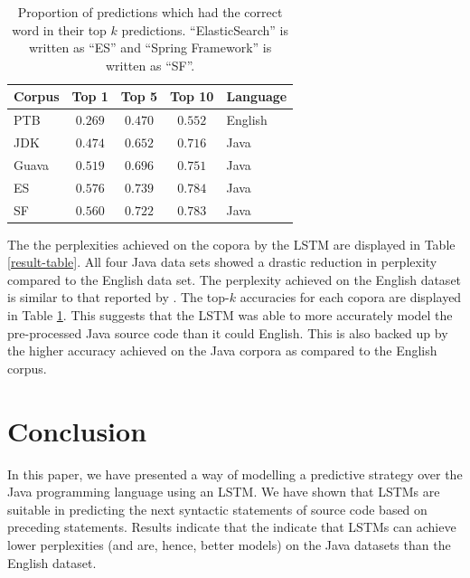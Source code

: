 \documentclass{article}
\begin{document}
\begin{table}[t]
    \caption{Proportion of predictions which had the correct
    word in their top $k$ predictions.
    ``ElasticSearch'' is written as ``ES'' and ``Spring
    Framework'' is written as ``SF''.}
    \label{topk-table}
    \vskip 0.15in
    \begin{center}
    \begin{tabular}{lcccl}
    \hline
    \abovespace\belowspace
    Corpus & Top 1 & Top 5 & Top 10 & Language \\
    \hline
    \abovespace
    PTB                 & $0.269$ & $0.470$ & $0.552$ & English \\
    JDK                 & $0.474$ & $0.652$ & $0.716$ & Java \\
    Guava               & $0.519$ & $0.696$ & $0.751$ & Java \\
    ES       & $0.576$ & $0.739$ & $0.784$ & Java \\
    \belowspace
    SF    & $0.560$ & $0.722$ & $0.783$ & Java \\
    \hline
    \end{tabular}
    \end{center}
    \vskip -0.1in
\end{table}

The the perplexities achieved on the copora by the LSTM are displayed in
Table \ref{result-table}. All four Java data sets showed a drastic reduction
in perplexity compared to the English data set. The perplexity achieved
on the English dataset is similar to that reported by \citet{LSTMArticle}.
The top-$k$ accuracies for each copora are displayed in Table
\ref{topk-table}.
This suggests that the LSTM was able to more accurately model the
pre-processed Java source code than it could English. This is also backed
up by the higher accuracy achieved on the Java corpora as compared to the
English corpus.

\section{Conclusion}

In this paper, we have presented a way of modelling a predictive strategy
over the Java programming language using an LSTM. We have shown that
LSTMs are suitable in predicting the next syntactic statements of source
code based on preceding statements. Results indicate that the indicate
that LSTMs can achieve lower perplexities (and are, hence, better models)
on the Java datasets than the English dataset.
\end{document}
